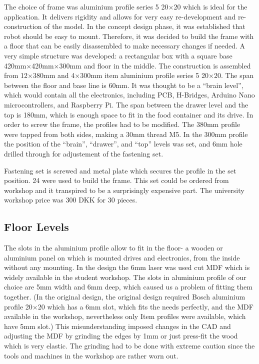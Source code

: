 \documentclass[11pt]{article}
\begin{document}
The choice of frame was aluminium profile series 5 20$\times$20 which is ideal for the application. It delivers rigidity and allows for very easy re-development and re-construction of the model. In the concept design phase, it was established that robot should be easy to mount. Therefore, it was decided to build the frame with a floor that can be easily disassembled to make necessary changes if needed. A very simple structure was developed: a rectangular box with a square base 420mm$\times$420mm$\times$300mm and floor in the middle. The construction is assembled from 12$\times$380mm and 4$\times$300mm item aluminium profile series 5 20$\times$20.  The span between the floor and base line is 60mm. It was thought to be a ``brain level'', which would contain all the electronics, including PCB, H-Bridges, Arduino Nano microcontrollers, and Raspberry Pi. The span between the drawer level and the top is 180mm, which is enough space to fit in the food container and its drive. In order to screw the frame, the profiles had to be modified. The 380mm profile were tapped from both sides, making a 30mm thread M5. In the 300mm profile the position of the ``brain'', ``drawer'', and ``top'' levels was set, and 6mm hole drilled through for adjustement of the fastening set.


Fastening set is screwed and metal plate which secures the profile in the set position. 24 were used to build the frame. This set could be ordered from workshop and it transpired to be a surprisingly expensive part. The university workshop price was 300 DKK for 30 pieces.

\subsection*{Floor Levels}

The slots in the aluminium profile allow to fit in the floor- a wooden or aluminium panel on which is mounted drives and electronics, from the inside without any mounting. In the design the 6mm laser was used cut MDF which is widely available in the student workshop. The slots in aluminium profile of our choice are 5mm width and 6mm deep, which caused us a problem of fitting them together. (In the original design, the original design required Bosch aluminium profile 20$\times$20 which has a 6mm slot, which fits the needs perfectly, and the MDF available in the workshop, nevertheless only Item profiles were available, which have 5mm slot.) This misunderstanding imposed changes in the CAD and adjusting the MDF by grinding the edges by 1mm or just press-fit the wood which is very elastic. The grinding had to be done with extreme caution since the tools and machines in the workshop are rather worn out.
\end{document}

